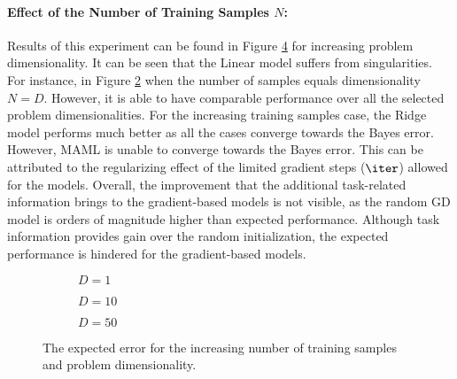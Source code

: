 \paragraph{Effect of the Number of Training Samples $N$:} Results of this experiment can be found in Figure \ref{fig:linear-N} for increasing problem dimensionality. It can be seen that the Linear model suffers from singularities. For instance, in Figure \ref{fig:linear-N-D-10} when the number of samples equals dimensionality $N=D$. However, it is able to have comparable performance over all the selected problem dimensionalities. For the increasing training samples case, the Ridge model performs much better as all the cases converge towards the Bayes error. However, MAML is unable to converge towards the Bayes error. This can be attributed to the regularizing effect of the limited gradient steps ($\iter$) allowed for the models. Overall, the improvement that the additional task-related information brings to the gradient-based models is not visible, as the random GD model is orders of magnitude higher than expected performance. Although task information provides gain over the random initialization, the expected performance is hindered for the gradient-based models.

\begin{figure}[!h]
  \centering
    \begin{subfigure}{0.3\textwidth}
      \centering
      \caption{$D=1$}
      \label{fig:linear-N-D-1}
    \end{subfigure}
    \begin{subfigure}{0.3\textwidth}
      \centering
      \caption{$D=10$}
      \label{fig:linear-N-D-10}
    \end{subfigure}
    \begin{subfigure}{0.3\textwidth}
      \centering
      \caption{$D=50$}
      \label{fig:linear-N-D-50}
    \end{subfigure}
  \caption{The expected error for the increasing number of training samples and problem dimensionality.}\label{fig:linear-N}
\end{figure}


